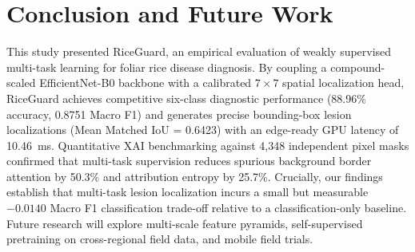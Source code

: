 \documentclass[conference]{IEEEtran}
\begin{document}
\section{Conclusion and Future Work}
\label{sec:conclusion}
This study presented RiceGuard, an empirical evaluation of weakly supervised multi-task learning for foliar rice disease diagnosis. By coupling a compound-scaled EfficientNet-B0 backbone with a calibrated $7\times 7$ spatial localization head, RiceGuard achieves competitive six-class diagnostic performance (88.96\% accuracy, 0.8751 Macro F1) and generates precise bounding-box lesion localizations (Mean Matched IoU = 0.6423) with an edge-ready GPU latency of 10.46~ms. Quantitative XAI benchmarking against 4,348 independent pixel masks confirmed that multi-task supervision reduces spurious background border attention by 50.3\% and attribution entropy by 25.7\%. Crucially, our findings establish that multi-task lesion localization incurs a small but measurable $-0.0140$ Macro F1 classification trade-off relative to a classification-only baseline. Future research will explore multi-scale feature pyramids, self-supervised pretraining on cross-regional field data, and mobile field trials.

\FloatBarrier
\end{document}
